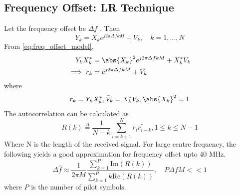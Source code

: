 \documentclass[journal,12pt,twocolumn]{IEEEtran}
\begin{document}
\subsection{Frequency Offset: LR Technique}
Let the frequency offset be 
$\Delta f$  
\cite{freq_offset}
.  Then
\begin{equation}
\label{eq:freq_offset_model}
Y_k= X_k e^{j2\pi\Delta fkM} + V_k, \quad k = 1,\dots,N 
\end{equation}  
From \eqref{eq:freq_offset_model},
%
\begin{align}
Y_kX_k^*&= \abs{X_k}^2e^{j2\pi\Delta fkM}+ X_k^*{V}_k\\
\implies r_k&=e^{j2\pi\Delta fkM}+ \bar{V}_k
\end{align}
where
\begin{align}
r_k=Y_kX_k^*, \bar{V}_k=X_k^*{V}_k, \abs{X_k}^2=1
\end{align}
%
The autocorrelation can be calculated as
\begin{equation}
R(k) \overset{\Delta}{=} \frac{1}{N-k}\sum_{i=k+1}^{N} r_{i}r^{*}_{i-k}
 , 1 \leq k \leq N-1
\end{equation}
Where N is the length of the received signal.
For large centre frequency, the following yields a good approximation for frequency offset upto 40 
MHz.
\begin{equation}
\Delta\hat{f} \approx \frac{1}{2\pi M}\frac{\sum_{k=1}^{P}\text{Im}(R(k))}{\sum_{k=1}^{P}k\text{Re}(R(k))},
\quad  P\Delta{f}M << 1
\label{eq:Z}
\end{equation}
%
where $P$ is the number of pilot symbols.
\end{document}
